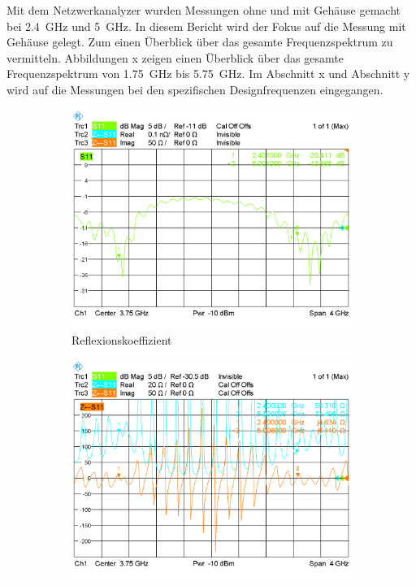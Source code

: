 Mit dem Netzwerkanalyzer wurden Messungen ohne und mit Gehäuse gemacht
bei \SI{2.4}{\giga\hertz} und \SI{5}{\giga\hertz}. In diesem Bericht
wird der Fokus auf die Messung mit Gehäuse gelegt. Zum einen Überblick
über das gesamte Frequenzspektrum zu vermitteln. Abbildungen x zeigen
einen Überblick über das gesamte Frequenzspektrum von
\SI{1.75}{\giga\hertz} bis \SI{5.75}{\giga\hertz}. Im Abschnitt x und
Abschnitt y wird auf die Messungen bei den spezifischen Designfrequenzen
eingegangen.

\begin{figure}[h!]
	\begin{center}
		\begin{subfigure}[t]{0.49\textwidth}
			\begin{center}
				\includegraphics[width=1\textwidth]{../fig/plt/S11_WITH_FULL.PNG}
				\caption{Reflexionskoeffizient}
				\label{fig:S11_with_full}
			\end{center}
		\end{subfigure}
		\begin{subfigure}[t]{0.49\textwidth}
			\begin{center}
				\includegraphics[width=1\textwidth]{../fig/plt/IMP_WITH_FULL.PNG}

\end{center}
\end{subfigure}
\end{center}
\end{figure}
